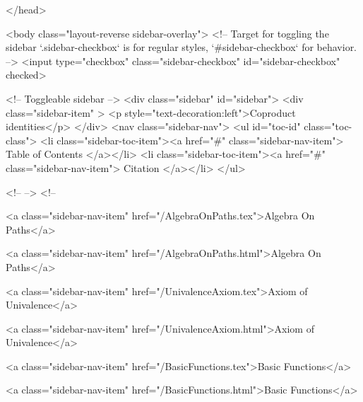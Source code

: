   
</head>




  <body class="layout-reverse sidebar-overlay">
    <!-- Target for toggling the sidebar `.sidebar-checkbox` is for regular
     styles, `#sidebar-checkbox` for behavior. -->
<input type="checkbox" class="sidebar-checkbox" id="sidebar-checkbox" checked>

<!-- Toggleable sidebar -->
<div class="sidebar" id="sidebar">
  <div class="sidebar-item" >
    <p style="text-decoration:left">Coproduct identities</p>
  </div>
  <nav class="sidebar-nav">
    <ul id="toc-id" class="toc-class">
  <li class="sidebar-toc-item"><a href="#" class="sidebar-nav-item"> Table of Contents </a></li>
  <li class="sidebar-toc-item"><a href="#" class="sidebar-nav-item"> Citation </a></li>
</ul>


    <!--  -->
    <!-- 
      
    
      
    
      
    
      
        
      
    
      
        
          <a class="sidebar-nav-item" href="/AlgebraOnPaths.tex">Algebra On Paths</a>
        
      
    
      
        
          <a class="sidebar-nav-item" href="/AlgebraOnPaths.html">Algebra On Paths</a>
        
      
    
      
        
          <a class="sidebar-nav-item" href="/UnivalenceAxiom.tex">Axiom of Univalence</a>
        
      
    
      
        
          <a class="sidebar-nav-item" href="/UnivalenceAxiom.html">Axiom of Univalence</a>
        
      
    
      
        
          <a class="sidebar-nav-item" href="/BasicFunctions.tex">Basic Functions</a>
        
      
    
      
        
          <a class="sidebar-nav-item" href="/BasicFunctions.html">Basic Functions</a>
        
      
    
